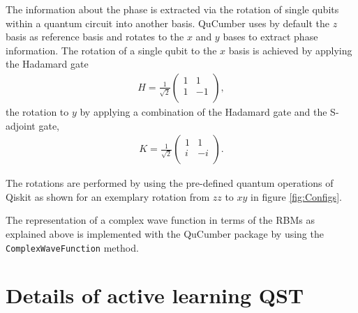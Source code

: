 \documentclass[pra,aps,showpacs,groupedaddress,superscriptaddress,twocolumn,toc=flat,biblatex,footinbib]{revtex4-1}
\begin{document}
The information about the phase is extracted via the rotation of single qubits within a quantum circuit into another basis. QuCumber uses by default the $z$ basis as reference basis and rotates to the $x$ and $y$ bases to extract phase information. The rotation of a single qubit to the $x$ basis is achieved by applying the Hadamard gate 
\begin{align}
    H = \frac{1}{\sqrt{2}}\left( \begin{array}{rr}
1 & 1  \\ 
1 & -1 \\
\end{array}\right),
\label{eq:Hadamard}
\end{align}
the rotation to $y$ by applying a combination of the Hadamard gate and the S-adjoint gate,
\begin{align}
    K = \frac{1}{\sqrt{2}}\left( \begin{array}{rr}
1 & 1 \\ 
i & -i \\
\end{array}\right).
\label{eq:K}
\end{align}

The rotations are performed by using the pre-defined quantum operations of Qiskit as shown for an exemplary rotation from $zz$ to $xy$ in figure \ref{fig:Configs}.

The representation of a complex wave function in terms of the RBMs as explained above is implemented with the QuCumber package by using the \texttt{ComplexWaveFunction} method.


\section{Details of active learning QST}

\end{document}
